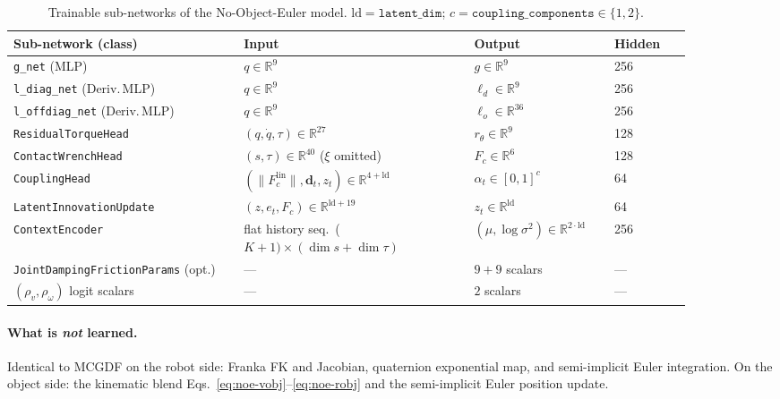 \documentclass[11pt]{article}
\begin{document}
\begin{table}[h]
\centering
\small
\begin{tabular}{p{0.30\linewidth} p{0.30\linewidth} p{0.18\linewidth} p{0.10\linewidth}}
\toprule
Sub-network (class) & Input & Output & Hidden \\
\midrule
\texttt{g\_net} (MLP)                & $q\in\mathbb{R}^9$        & $g\in\mathbb{R}^9$         & 256 \\
\texttt{l\_diag\_net} (Deriv.\,MLP)  & $q\in\mathbb{R}^9$        & $\ell_d\in\mathbb{R}^9$    & 256 \\
\texttt{l\_offdiag\_net} (Deriv.\,MLP) & $q\in\mathbb{R}^9$      & $\ell_o\in\mathbb{R}^{36}$ & 256 \\
\texttt{ResidualTorqueHead}          & $(q,\dot q,\tau)\in\mathbb{R}^{27}$ & $r_\theta\in\mathbb{R}^9$ & 128 \\
\texttt{ContactWrenchHead}           & $(s,\tau)\in\mathbb{R}^{40}$ ($\xi$ omitted) & $F_c\in\mathbb{R}^6$ & 128 \\
\texttt{CouplingHead}                & $(\|F_c^{\mathrm{lin}}\|,\mathbf{d}_t,z_t)\in\mathbb{R}^{4+\mathrm{ld}}$ & $\alpha_t\in[0,1]^{c}$ & 64 \\
\texttt{LatentInnovationUpdate}      & $(z,e_t,F_c)\in\mathbb{R}^{\mathrm{ld}+19}$ & $z_{t}\in\mathbb{R}^{\mathrm{ld}}$ & 64 \\
\texttt{ContextEncoder}              & flat history seq.\ ($K{+}1)\times(\dim s + \dim\tau)$ & $(\mu,\log\sigma^2)\in\mathbb{R}^{2\cdot\mathrm{ld}}$ & 256 \\
\texttt{JointDampingFrictionParams} (opt.) & --- & $9{+}9$ scalars & --- \\
$(\rho_v,\rho_\omega)$ logit scalars & --- & $2$ scalars & --- \\
\bottomrule
\end{tabular}
\caption{Trainable sub-networks of the No-Object-Euler model.
$\mathrm{ld}=\texttt{latent\_dim}$; $c=\texttt{coupling\_components}\in\{1,2\}$.}
\label{tab:noe-subnets}
\end{table}

\paragraph{What is \emph{not} learned.}
Identical to MCGDF on the robot side: Franka FK and Jacobian,
quaternion exponential map, and semi-implicit Euler integration.  On
the object side: the kinematic blend
Eqs.~\eqref{eq:noe-vobj}--\eqref{eq:noe-robj} and the
semi-implicit Euler position update.
\end{document}
